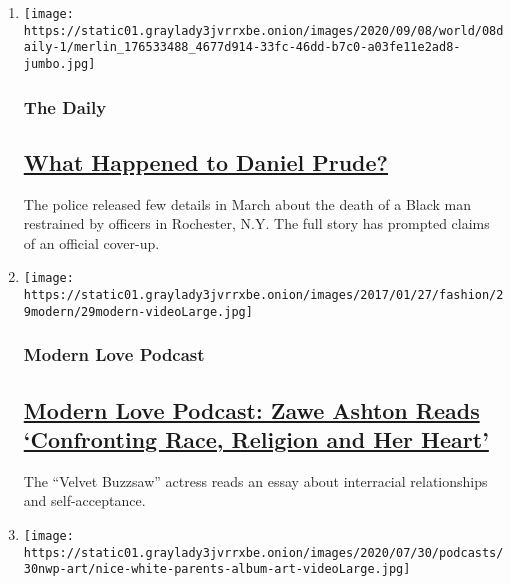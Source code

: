 \begin{enumerate}
\def\labelenumi{\arabic{enumi}.}
\item
  \texttt{[image: https://static01.graylady3jvrrxbe.onion/images/2020/09/08/world/08daily-1/merlin\_176533488\_4677d914-33fc-46dd-b7c0-a03fe11e2ad8-jumbo.jpg]}

  \hypertarget{the-daily}{%
  \subsubsection{The Daily}\label{the-daily}}

  \hypertarget{what-happened-to-daniel-prude}{%
  \subsection{\texorpdfstring{\href{/2020/09/08/podcasts/the-daily/Daniel-Prude-BLM-police.html}{What
  Happened to Daniel
  Prude?}}{What Happened to Daniel Prude?}}\label{what-happened-to-daniel-prude}}

  The police released few details in March about the death of a Black
  man restrained by officers in Rochester, N.Y. The full story has
  prompted claims of an official cover-up.
\item
  \texttt{[image: https://static01.graylady3jvrrxbe.onion/images/2017/01/27/fashion/29modern/29modern-videoLarge.jpg]}

  \hypertarget{modern-love-podcast}{%
  \subsubsection{Modern Love Podcast}\label{modern-love-podcast}}

  \hypertarget{modern-love-podcast-zawe-ashton-reads-confronting-race-religion-and-her-heart}{%
  \subsection{\texorpdfstring{\href{/2020/06/24/style/modern-love-podcast-zawe-ashton.html}{Modern
  Love Podcast: Zawe Ashton Reads `Confronting Race, Religion and Her
  Heart'}}{Modern Love Podcast: Zawe Ashton Reads `Confronting Race, Religion and Her Heart'}}\label{modern-love-podcast-zawe-ashton-reads-confronting-race-religion-and-her-heart}}

  The ``Velvet Buzzsaw'' actress reads an essay about interracial
  relationships and self-acceptance.
\item
  \texttt{[image: https://static01.graylady3jvrrxbe.onion/images/2020/07/30/podcasts/30nwp-art/nice-white-parents-album-art-videoLarge.jpg]}


\end{enumerate}
